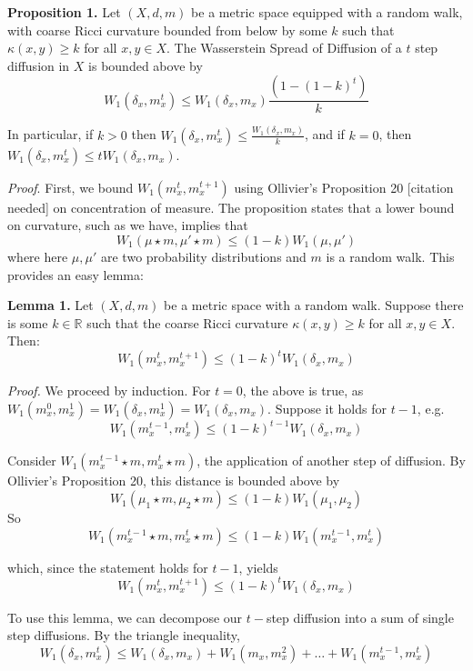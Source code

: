 \documentclass[
]{agujournal2019}
\begin{document}
\textbf{Proposition 1.} Let \((X,d,m)\) be a metric space equipped with
a random walk, with coarse Ricci curvature bounded from below by some
\(k\) such that \(\kappa(x,y) \geq k\) for all \(x,y \in X\). The
Wasserstein Spread of Diffusion of a \(t\) step diffusion in \(X\) is
bounded above by \[
W_{1}(\delta_{x}, m_{x}^t) \leq W_1\left(\delta_x,m_x\right)\frac{(1-(1-k)^t)}{k}
\]

In particular, if \(k>0\) then
\(W_{1}(\delta_{x},m_{x}^t) \leq \frac{W_1\left(\delta_x,m_x\right)}{k}\),
and if \(k=0\), then
\(W_{1}(\delta_{x},m_{x}^t) \leq tW_1\left(\delta_x,m_x\right)\).

\emph{Proof}. First, we bound \(W_{1}(m_{x}^t,m_{x}^{t+1})\) using
Ollivier's Proposition 20 {[}citation needed{]} on concentration of
measure. The proposition states that a lower bound on curvature, such as
we have, implies that \[
W_{1}(\mu \star m, \mu' \star m) \leq (1-k)W_{1}(\mu, \mu')
\] where here \(\mu,\mu'\) are two probability distributions and \(m\)
is a random walk. This provides an easy lemma:

\textbf{Lemma 1.} Let \((X,d,m)\) be a metric space with a random walk.
Suppose there is some \(k \in \mathbb{R}\) such that the coarse Ricci
curvature \(\kappa(x,y) \geq k\) for all \(x,y \in X\). Then: \[
W_1\left(m_x^t, m_x^{t+1}\right) \leq(1-k)^t W_1\left(\delta_x,m_x\right)
\]

\emph{Proof.} We proceed by induction. For \(t=0\), the above is true,
as
\(W_{1}(m_{x}^0, m_{x}^{1}) =W_{1}(\delta_x, m_{x}^{1}) = W_1\left(\delta_x,m_x\right)\).
Suppose it holds for \(t-1\), e.g. \[
W_1\left(m_x^{t-1}, m_x^{t}\right) \leq(1-k)^{t-1} W_1\left(\delta_x,m_x\right)
\]

Consider \(W_1\left(m_x^{t-1}\star m, m_x^{t}\star m\right)\), the
application of another step of diffusion. By Ollivier's Proposition 20,
this distance is bounded above by \[
W_1\left(\mu_1 \star m, \mu_2 \star m\right) \leq(1-k) W_1\left(\mu_1, \mu_2\right)
\] So \[
W_1\left(m_x^{t-1}\star m, m_x^{t}\star m\right) \leq  (1-k)W_1\left(m_x^{t-1}, m_x^{t}\right)
\]

which, since the statement holds for \(t-1\), yields \[
W_1\left(m_x^t, m_x^{t+1}\right) \leq(1-k)^t W_1\left(\delta_x,m_x\right)
\]

To use this lemma, we can decompose our \(t-\)step diffusion into a sum
of single step diffusions. By the triangle inequality, \[
W_{1}(\delta_{x},m_{x}^t) \leq W_1\left(\delta_x,m_x\right) + W_{1}(m_{x},m_{x}^2) + \dots + W_{1}(m_{x}^{t-1}, m_{x}^t)
\]
\end{document}
